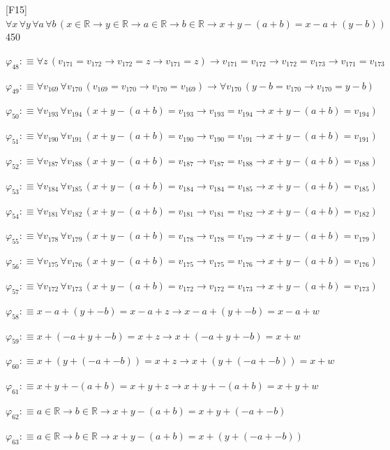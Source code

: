 \begin{fullproof}{[F15]}{$\forall x\,\forall y\,\forall a\,\forall b\,(x \in \mathbb{R} \to y \in \mathbb{R} \to a \in \mathbb{R} \to b \in \mathbb{R} \to x + y - (a + b) = x - a + (y - b))$}{450}
\begin{abbrevlist}
\item $\varphi_{48} :\equiv \forall z\,(v_{171} = v_{172} \to v_{172} = z \to v_{171} = z) \to v_{171} = v_{172} \to v_{172} = v_{173} \to v_{171} = v_{173}$
\item $\varphi_{49} :\equiv \forall v_{169}\,\forall v_{170}\,(v_{169} = v_{170} \to v_{170} = v_{169}) \to \forall v_{170}\,(y - b = v_{170} \to v_{170} = y - b)$
\item $\varphi_{50} :\equiv \forall v_{193}\,\forall v_{194}\,(x + y - (a + b) = v_{193} \to v_{193} = v_{194} \to x + y - (a + b) = v_{194})$
\item $\varphi_{51} :\equiv \forall v_{190}\,\forall v_{191}\,(x + y - (a + b) = v_{190} \to v_{190} = v_{191} \to x + y - (a + b) = v_{191})$
\item $\varphi_{52} :\equiv \forall v_{187}\,\forall v_{188}\,(x + y - (a + b) = v_{187} \to v_{187} = v_{188} \to x + y - (a + b) = v_{188})$
\item $\varphi_{53} :\equiv \forall v_{184}\,\forall v_{185}\,(x + y - (a + b) = v_{184} \to v_{184} = v_{185} \to x + y - (a + b) = v_{185})$
\item $\varphi_{54} :\equiv \forall v_{181}\,\forall v_{182}\,(x + y - (a + b) = v_{181} \to v_{181} = v_{182} \to x + y - (a + b) = v_{182})$
\item $\varphi_{55} :\equiv \forall v_{178}\,\forall v_{179}\,(x + y - (a + b) = v_{178} \to v_{178} = v_{179} \to x + y - (a + b) = v_{179})$
\item $\varphi_{56} :\equiv \forall v_{175}\,\forall v_{176}\,(x + y - (a + b) = v_{175} \to v_{175} = v_{176} \to x + y - (a + b) = v_{176})$
\item $\varphi_{57} :\equiv \forall v_{172}\,\forall v_{173}\,(x + y - (a + b) = v_{172} \to v_{172} = v_{173} \to x + y - (a + b) = v_{173})$
\item $\varphi_{58} :\equiv x - a + (y + -b) = x - a + z \to x - a + (y + -b) = x - a + w$
\item $\varphi_{59} :\equiv x + (-a + y + -b) = x + z \to x + (-a + y + -b) = x + w$
\item $\varphi_{60} :\equiv x + (y + (-a + -b)) = x + z \to x + (y + (-a + -b)) = x + w$
\item $\varphi_{61} :\equiv x + y + -(a + b) = x + y + z \to x + y + -(a + b) = x + y + w$
\item $\varphi_{62} :\equiv a \in \mathbb{R} \to b \in \mathbb{R} \to x + y - (a + b) = x + y + (-a + -b)$
\item $\varphi_{63} :\equiv a \in \mathbb{R} \to b \in \mathbb{R} \to x + y - (a + b) = x + (y + (-a + -b))$

\end{abbrevlist}
\end{fullproof}
